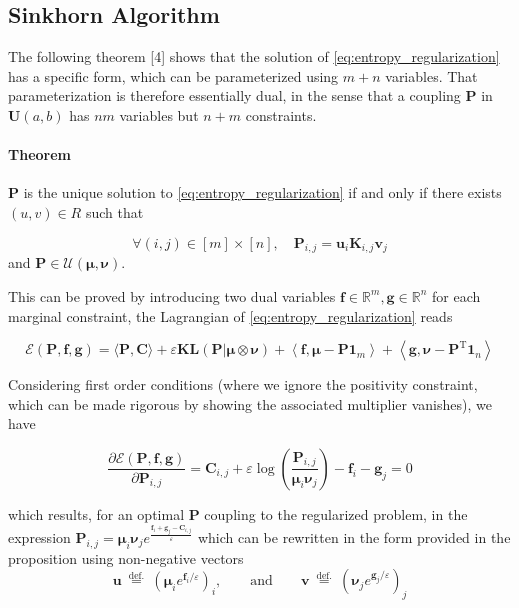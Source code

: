 \subsection{Sinkhorn Algorithm}
The following theorem [4] shows that the solution of \ref{eq:entropy_regularization} has a specific form, which can be parameterized
using $m + n$ variables. That parameterization is therefore essentially dual, in the sense that a coupling $\mathbf{P}$ in
$\mathbf{U}(a, b)$ has $nm$ variables but $n + m$ constraints.

\paragraph{Theorem}
  $\mathbf{P}$ is the unique solution to \ref{eq:entropy_regularization} if and only if there exists $(u, v) \in R$ such that
  
  \begin{equation}
    \label{eq:thm1}
    \forall(i, j) \in [m] \times [n], \quad \mathbf{P}_{i, j}=\mathbf{u}_{i} \mathbf{K}_{i, j} \mathbf{v}_{j}
  \end{equation}
  and $\mathbf{P} \in \mathcal{U}(\mathbf{\mu}, \mathbf{\nu})$.

This can be proved by introducing two dual variables $\mathbf{f} \in \mathbb{R}^{m}, \mathbf{g} \in \mathbb{R}^{n}$ for each marginal constraint, the Lagrangian of \ref{eq:entropy_regularization}
reads

\begin{equation}
  \mathcal{E}(\mathbf{P}, \mathbf{f}, \mathbf{g})=\langle\mathbf{P}, \mathbf{C}\rangle+\varepsilon \mathbf{K} \mathbf{L}(\mathbf{P} | \mathbf{\mu} \otimes \mathbf{\nu})+\left\langle\mathbf{f}, \mathbf{\mu}-\mathbf{P} \mathbf{1}_{m}\right\rangle+\left\langle\mathbf{g}, \mathbf{\nu}-\mathbf{P}^{\mathrm{T}} \mathbf{1}_{n}\right\rangle
\end{equation}

Considering first order conditions (where we ignore the positivity constraint, which can be made rigorous by
showing the associated multiplier vanishes), we have

\begin{equation}
  \label{eq:partial}
  \frac{\partial \mathcal{E}(\mathbf{P}, \mathbf{f}, \mathbf{g})}{\partial \mathbf{P}_{i, j}}=\mathbf{C}_{i, j}+\varepsilon \log \left(\frac{\mathbf{P}_{i, j}}{\mathbf{\mu}_{i} \mathbf{\nu}_{j}}\right)-\mathbf{f}_{i}-\mathbf{g}_{j}=0
\end{equation}

which results, for an optimal $\mathbf{P}$ coupling to the regularized problem, in the expression $\mathbf{P}_{i, j}=\mathbf{\mu}_{i} \mathbf{\nu}_{j} e^{\frac{\mathbf{f}_{i}+\mathbf{g}_{j}-\mathbf{C}_{i, j}}{\varepsilon}}$ 
which can be rewritten in the form provided in the proposition using non-negative vectors
\begin{equation}
  \mathbf{u} \stackrel{\text { def. }}{=}\left(\mathbf{\mu}_{i} e^{\mathbf{f}_{i} / \varepsilon}\right)_{i}, \qquad \text{and} \qquad \mathbf{v} \stackrel{\text { def. }}{=}\left(\mathbf{\nu}_{j} e^{\mathbf{g}_{j} / \varepsilon}\right)_{j}
\end{equation}

